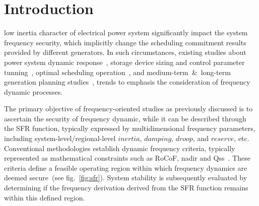 \documentclass[lettersize,journal]{IEEEtran}
\begin{document}
\vspace{-0.25cm}

\section{Introduction}
 low inertia character of electrical power system significantly impact the system frequency security, which implicitly change the scheduling commitment results provided by different generators. In such circumstances, existing studies about power system dynamic response~\cite{8918440,10168982}, storage device sizing and control parameter tunning~\cite{markovic2019optimal}, optimal scheduling operation~\cite{9765359,10554988,10819485}, and  medium-term~\&~long-term generation planning studies~\cite{10820061,10938039}, trends to emphasis the consideration of frequency dynamic processes.



The primary objective of frequency-oriented studies as previously discussed is to ascertain the security of frequency dynamic, while it can be described through the SFR function, typically expressed by multidimensional frequency parameters, including system-level/regional-level $inertia$, $damping$, $droop$, and $reserve$, etc. Conventional methodologies establish dynamic frequency criteria, typically represented as mathematical constraints such as RoCoF, nadir and Qss~\cite{markovic2019optimal,8918440,10168982,9765359,10554988,10819485,10820061,10938039}. These criteria define a feasible operating region within which frequency dynamics are deemed secure~(see fig.~\ref{fig:sfr}). System stability is subsequently evaluated by determining if the frequency derivation derived from the SFR function remains within this defined region.
\end{document}
